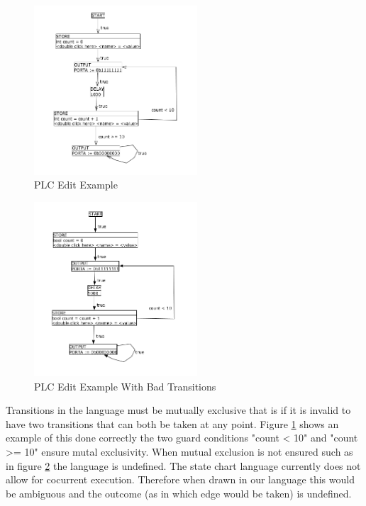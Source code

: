 \begin{figure}[htp]
    \centering
    \includegraphics[width=230px]{./images/tool_transition_example.png}
    \caption{PLC Edit Example}
    \label{fig:tool_transition_example}
\end{figure}

\begin{figure}[htp]
    \centering
    \includegraphics[width=230px]{./images/tool_transition_example_bad.png}
    \caption{PLC Edit Example With Bad Transitions}
    \label{fig:tool_transition_example_bad}
\end{figure}

Transitions in the language must be mutually exclusive that is if it is invalid to have two transitions that can both be taken at any point. Figure \ref{fig:tool_transition_example} shows an example of this done correctly the two guard conditions "count < 10" and "count >= 10" ensure mutal exclusivity. When mutual exclusion is not ensured such as in figure \ref{fig:tool_transition_example_bad} the language is undefined. The state chart language currently does not allow for cocurrent execution. Therefore when drawn in our language this would be ambiguous and the outcome (as in which edge would be taken) is undefined.
